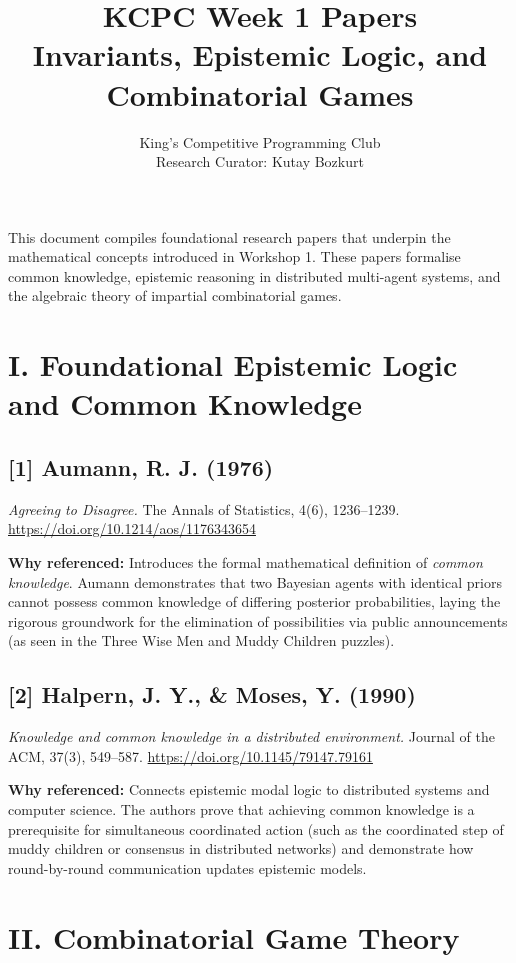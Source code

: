 \documentclass[11pt]{article}
\title{KCPC Week 1 Papers\\Invariants, Epistemic Logic, and Combinatorial Games}
\author{King's Competitive Programming Club \\ \small Research Curator: Kutay Bozkurt}
\date{}
\begin{document}
\maketitle
\thispagestyle{fancy}

\noindent
This document compiles foundational research papers that underpin the mathematical concepts introduced in Workshop 1. These papers formalise common knowledge, epistemic reasoning in distributed multi-agent systems, and the algebraic theory of impartial combinatorial games.

\section*{I. Foundational Epistemic Logic and Common Knowledge}

\subsection*{[1] Aumann, R. J. (1976)}
\textit{Agreeing to Disagree.}
The Annals of Statistics, 4(6), 1236--1239.
\url{https://doi.org/10.1214/aos/1176343654}

\textbf{Why referenced:}
Introduces the formal mathematical definition of \textit{common knowledge}. Aumann demonstrates that two Bayesian agents with identical priors cannot possess common knowledge of differing posterior probabilities, laying the rigorous groundwork for the elimination of possibilities via public announcements (as seen in the Three Wise Men and Muddy Children puzzles).

\vspace{1em}

\subsection*{[2] Halpern, J. Y., \& Moses, Y. (1990)}
\textit{Knowledge and common knowledge in a distributed environment.}
Journal of the ACM, 37(3), 549--587.
\url{https://doi.org/10.1145/79147.79161}

\textbf{Why referenced:}
Connects epistemic modal logic to distributed systems and computer science. The authors prove that achieving common knowledge is a prerequisite for simultaneous coordinated action (such as the coordinated step of muddy children or consensus in distributed networks) and demonstrate how round-by-round communication updates epistemic models.

\section*{II. Combinatorial Game Theory}
\end{document}
